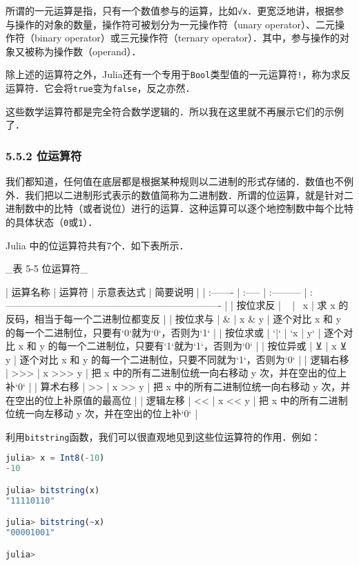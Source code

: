所谓的一元运算是指，只有一个数值参与的运算，比如\verb|√x|．更宽泛地讲，根据参与操作的对象的数量，操作符可被划分为一元操作符（unary operator）、二元操作符（binary operator）或三元操作符（ternary operator）．其中，参与操作的对象又被称为操作数（operand）．

除上述的运算符之外，Julia还有一个专用于\verb|Bool|类型值的一元运算符\verb|!|，称为求反运算符．它会将\verb|true|变为\verb|false|，反之亦然．

这些数学运算符都是完全符合数学逻辑的．所以我在这里就不再展示它们的示例了．

\subsubsection{5.5.2 位运算符}

我们都知道，任何值在底层都是根据某种规则以二进制的形式存储的．数值也不例外．我们把以二进制形式表示的数值简称为二进制数．所谓的位运算，就是针对二进制数中的比特（或者说位）进行的运算．这种运算可以逐个地控制数中每个比特的具体状态（\verb|0|或\verb|1|）．

Julia 中的位运算符共有7个．如下表所示．

_表 5-5 位运算符_

| 运算名称 | 运算符 | 示意表达式 | 简要说明                                                             |
| :------- | :----- | :--------- | :------------------------------------------------------------------- |
| 按位求反 | ~      | ~x         | 求 x 的反码，相当于每一个二进制位都变反                              |
| 按位求与 | &      | x & y      | 逐个对比 x 和 y 的每一个二进制位，只要有`0`就为`0`，否则为`1`        |
| 按位求或 | `|`    | `x | y`    | 逐个对比 x 和 y 的每一个二进制位，只要有`1`就为`1`，否则为`0`        |
| 按位异或 | ⊻      | x ⊻ y      | 逐个对比 x 和 y 的每一个二进制位，只要不同就为`1`，否则为`0`         |
| 逻辑右移 | >>>    | x >>> y    | 把 x 中的所有二进制位统一向右移动 y 次，并在空出的位上补`0`          |
| 算术右移 | >>     | x >> y     | 把 x 中的所有二进制位统一向右移动 y 次，并在空出的位上补原值的最高位 |
| 逻辑左移 | <<     | x << y     | 把 x 中的所有二进制位统一向左移动 y 次，并在空出的位上补`0`          |

利用\verb|bitstring|函数，我们可以很直观地见到这些位运算符的作用．例如：
\begin{lstlisting}[language=julia]
julia> x = Int8(-10)
-10

julia> bitstring(x)
"11110110"

julia> bitstring(~x)
"00001001"

julia> 
\end{lstlisting}

